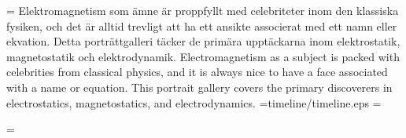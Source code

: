 \noindent
\ifnum\lang=\swedish
Elektromagnetism som {\"a}mne {\"a}r proppfyllt med celebriteter inom den
klassiska fysiken, och det {\"a}r alltid trevligt att ha ett ansikte associerat
med ett namn eller ekvation. Detta portr{\"a}ttgalleri t{\"a}cker de prim{\"a}ra
uppt{\"a}ckarna inom elektrostatik, magnetostatik och elektrodynamik.
\else
Electromagnetism as a subject is packed with celebrities from classical physics,
and it is always nice to have a face associated with a name or equation. This
portrait gallery covers the primary discoverers in electrostatics,
magnetostatics, and electrodynamics.
\fi
\medskip
\newread\imgtest
\openin\imgtest=timeline/timeline.eps
\ifeof\imgtest
  \ifnum\lang=\swedish
    \centerline{{\epsfxsize=480pt
      }}
  \else
    \centerline{{\epsfxsize=480pt
      }}
  \fi
\else
  \closein\imgtest
  \ifnum\lang=\swedish
    \centerline{{\epsfxsize=480pt
      }}
  \else
    \centerline{{\epsfxsize=480pt
      }}
  \fi
\fi
\vfill\eject
\portraitpage{\dalembert}{\ampere}{\biot}{\debroglie}   %
\portraitpage{\coulomb}{\faraday}{\dufay}{\feynman}     %
\portraitpage{\franklin}{\gauss}{\gilbert}{\heaviside}  %
\portraitpage{\kelvin}{\laplace}{\lenz}{\lorentz}       %
\portraitpage{\lorenz}{\maxwell}{\neumann}{\oersted}    %
\portraitpage{\poisson}{\savart}{\stokes}{\tesla}       %
\portraitpage{\thomson}{\gpthomson}{\weber}{\wilson}    %


